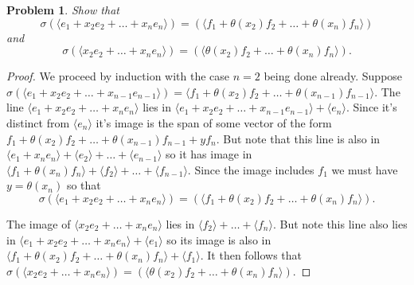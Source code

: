\documentclass{article}
\newtheorem{problem}{Problem}
\begin{document}
\begin{problem}
Show that
\[
\sigma(\langle e_1 + x_2e_2 + \dots + x_ne_n \rangle ) = (\langle f_1 + \theta(x_2)f_2 + \dots + \theta(x_n)f_n \rangle )
\]
and
\[
\sigma(\langle x_2e_2 + \dots + x_ne_n \rangle ) = (\langle \theta(x_2)f_2 + \dots + \theta(x_n)f_n \rangle ).
\]
\end{problem}
\begin{proof}
We proceed by induction with the case $n = 2$ being done already. Suppose $\sigma(\langle e_1 + x_2e_2 + \dots + x_{n-1} e_{n-1} \rangle ) = \langle f_1 + \theta(x_2) f_2 + \dots + \theta(x_{n-1}) f_{n-1} \rangle$. The line $\langle e_1 + x_2e_2 + \dots + x_ne_n \rangle$ lies in $\langle e_1 + x_2e_2 + \dots + x_{n-1}e_{n-1} \rangle + \langle e_n \rangle$. Since it's distinct from $\langle e_n \rangle$ it's image is the span of some vector of the form $f_1 + \theta(x_2) f_2 + \dots + \theta(x_{n-1}) f_{n-1} + y f_n$. But note that this line is also in $\langle e_1 + x_ne_n \rangle + \langle e_2 \rangle + \dots + \langle e_{n-1} \rangle$ so it has image in $\langle f_1 + \theta(x_n) f_n \rangle + \langle f_2 \rangle + \dots + \langle f_{n-1} \rangle$. Since the image includes $f_1$ we must have $y = \theta(x_n)$ so that
\[
\sigma(\langle e_1 + x_2e_2 + \dots + x_ne_n \rangle ) = (\langle f_1 + \theta(x_2)f_2 + \dots + \theta(x_n)f_n \rangle ).
\]

The image of $\langle x_2e_2 + \dots + x_ne_n \rangle$ lies in $\langle f_2 \rangle + \dots + \langle f_n \rangle$. But note this line also lies in $\langle e_1 + x_2e_2 + \dots + x_ne_n \rangle + \langle e_1 \rangle$ so its image is also in $\langle f_1 + \theta(x_2) f_2 + \dots + \theta(x_n) f_n \rangle + \langle f_1 \rangle$. It then follows that $\sigma(\langle x_2e_2 + \dots + x_ne_n \rangle ) = (\langle \theta(x_2)f_2 + \dots + \theta(x_n)f_n \rangle )$.
\end{proof}
\end{document}

